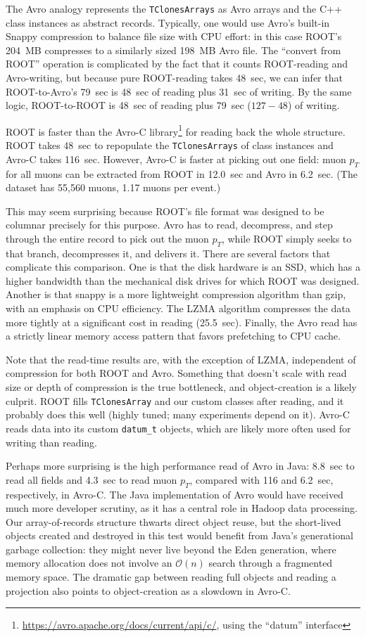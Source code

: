 \documentclass{article}
\begin{document}
The Avro analogy represents the {\tt TClonesArrays} as Avro arrays and the C++ class instances as abstract records. Typically, one would use Avro's built-in Snappy compression to balance file size with CPU effort: in this case ROOT's 204~MB compresses to a similarly sized 198~MB Avro file. The ``convert from ROOT'' operation is complicated by the fact that it counts ROOT-reading and Avro-writing, but because pure ROOT-reading takes 48~sec, we can infer that ROOT-to-Avro's 79~sec is 48~sec of reading plus 31~sec of writing. By the same logic, ROOT-to-ROOT is 48~sec of reading plus 79~sec ($127 - 48$) of writing.

ROOT is faster than the Avro-C library\footnote{\url{https://avro.apache.org/docs/current/api/c/}, using the ``datum'' interface} for reading back the whole structure. ROOT takes 48~sec to repopulate the {\tt TClonesArrays} of class instances and Avro-C takes 116~sec. However, Avro-C is faster at picking out one field: muon $p_T$ for all muons can be extracted from ROOT in 12.0~sec and Avro in 6.2~sec. (The dataset has 55,560 muons, 1.17 muons per event.)

This may seem surprising because ROOT's file format was designed to be columnar precisely for this purpose. Avro has to read, decompress, and step through the entire record to pick out the muon $p_T$, while ROOT simply seeks to that branch, decompresses it, and delivers it. There are several factors that complicate this comparison. One is that the disk hardware is an SSD, which has a higher bandwidth than the mechanical disk drives for which ROOT was designed. Another is that snappy is a more lightweight compression algorithm than gzip, with an emphasis on CPU efficiency. The LZMA algorithm compresses the data more tightly at a significant cost in reading (25.5~sec). Finally, the Avro read has a strictly linear memory access pattern that favors prefetching to CPU cache.

Note that the read-time results are, with the exception of LZMA, independent of compression for both ROOT and Avro. Something that doesn't scale with read size or depth of compression is the true bottleneck, and object-creation is a likely culprit. ROOT fills {\tt TClonesArray} and our custom classes after reading, and it probably does this well (highly tuned; many experiments depend on it). Avro-C reads data into its custom {\tt datum\_t} objects, which are likely more often used for writing than reading.

Perhaps more surprising is the high performance read of Avro in Java: 8.8~sec to read all fields and 4.3~sec to read muon $p_T$, compared with 116 and 6.2~sec, respectively, in Avro-C. The Java implementation of Avro would have received much more developer scrutiny, as it has a central role in Hadoop data processing. Our array-of-records structure thwarts direct object reuse, but the short-lived objects created and destroyed in this test would benefit from Java's generational garbage collection: they might never live beyond the Eden generation, where memory allocation does not involve an $\mathcal{O}(n)$ search through a fragmented memory space. The dramatic gap between reading full objects and reading a projection also points to object-creation as a slowdown in Avro-C.
\end{document}
